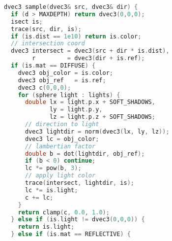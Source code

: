 \headerfooteroff{}
\pagecolor{black!5}\afterpage{\nopagecolor}
\begin{lstlisting}[language=C]
dvec3 sample(dvec3& src, dvec3& dir) {
  if (d > MAXDEPTH) return dvec3(0,0,0);
  isect is;
  trace(src, dir, is);
  if (is.dist == 1e10) return is.color;
  // intersection coord
  dvec3 intersect = dvec3(src + dir * is.dist),        
        r         = dvec3(dir + is.ref);
  if (is.mat == DIFFUSE) {
    dvec3 obj_color = is.color;
    dvec3 obj_ref   = is.ref;
    dvec3 c(0,0,0);
    for (sphere light : lights) {
      double lx = light.p.x + SOFT_SHADOWS,
             ly = light.p.y,
             lz = light.p.z + SOFT_SHADOWS;
      // direction to light
      dvec3 lightdir = norm(dvec3(lx, ly, lz));
      dvec3 lc = obj_color;
      // lambertian factor
      double b = dot(lightdir, obj_ref);
      if (b < 0) continue;
      lc *= pow(b, 3);
      // apply light color
      trace(intersect, lightdir, is);
      lc *= is.light;
      c += lc;
    }
    return clamp(c, 0.0, 1.0);
  } else if (is.light != dvec3(0,0,0)) {
    return is.light;
  } else if (is.mat == REFLECTIVE) {
\end{lstlisting}
\clearpage
\headerfooteron{}